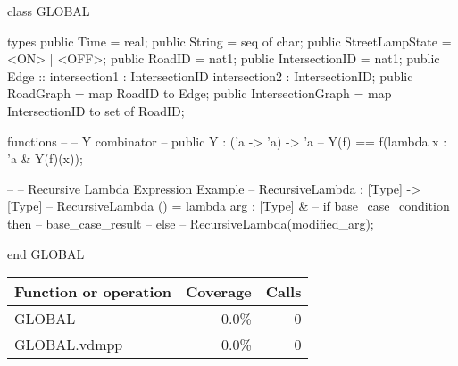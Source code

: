 \documentclass[a4paper]{article}
\begin{document}
\title{}
\author{}
\begin{vdm_al}
class GLOBAL

types
    public Time = real;
    public String = seq of char;
    public StreetLampState = <ON> | <OFF>;
    public RoadID = nat1;
    public IntersectionID = nat1;
    public Edge :: intersection1 : IntersectionID
                   intersection2 : IntersectionID;
    public RoadGraph = map RoadID to Edge;
    public IntersectionGraph = map IntersectionID to set of RoadID;

functions
    -- -- Y combinator
    -- public Y : ('a -> 'a) -> 'a
    -- Y(f) == f(lambda x : 'a & Y(f)(x));

    -- -- Recursive Lambda Expression Example
    -- RecursiveLambda : [Type] -> [Type]
    -- RecursiveLambda () = lambda arg : [Type] & 
    --                     if base_case_condition then 
    --                         base_case_result 
    --                     else 
    --                         RecursiveLambda(modified_arg);


end GLOBAL
\end{vdm_al}
\bigskip
\begin{longtable}{|l|r|r|}
\hline
Function or operation & Coverage & Calls \\
\hline
\hline
GLOBAL & 0.0\% & 0 \\
\hline
\hline
GLOBAL.vdmpp & 0.0\% & 0 \\
\hline
\end{longtable}
\end{document}

